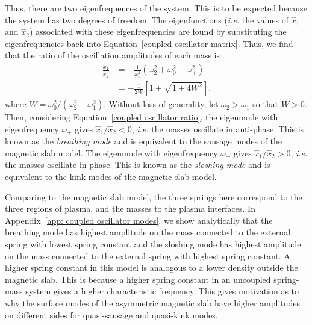 \documentclass[12pt]{../style-files/ociamthesis}
\begin{document}
Thus, there are two eigenfrequences of the system. This is to be expected because the system has two degrees of freedom. The eigenfunctions (\textit{i.e.} the values of $\hat{x}_1$ and $\hat{x}_2$) associated with these eigenfrequencies are found by substituting the eigenfrequencies back into Equation~\eqref{coupled oscillator matrix}. Thus, we find that the ratio of the oscillation amplitudes of each mass is
\begin{align}
	\frac{\hat{x}_1}{\hat{x}_2} & = -\frac{1}{\omega_0^2}(\omega_2^2 + \omega_0^2 - \omega_\pm^2) \\
	& = -\frac{1}{2W}\left[1 \pm \sqrt{1 + 4W^2} \right]. \label{coupled oscillator ratio}
\end{align}
where $W = \omega_0^2 / (\omega_2^2 - \omega_1^2)$. Without loss of generality, let $\omega_2 > \omega_1$ so that $W > 0$. Then, considering Equation~\ref{coupled oscillator ratio}, the eigenmode with eigenfrequency $\omega_+$ gives $\hat{x}_1 / \hat{x}_2 < 0$, \textit{i.e.} the masses oscillate in anti-phase. This is known as the \textit{breathing mode} and is equivalent to the sausage modes of the magnetic slab model. The eigenmode with eigenfrequency $\omega_-$ gives $\hat{x}_1 / \hat{x}_2 > 0$, \textit{i.e.} the masses oscillate in phase. This is known as the \textit{sloshing mode} and is equivalent to the kink modes of the magnetic slab model.

Comparing to the magnetic slab model, the three springs here correspond to the three regions of plasma, and the masses to the plasma interfaces. In Appendix~\ref{app: coupled oscillator modes}, we show analytically that the breathing mode has highest amplitude on the mass connected to the external spring with lowest spring constant and the sloshing mode has highest amplitude on the mass connected to the external spring with highest spring constant. A higher spring constant in this model is analogous to a lower density outside the magnetic slab. This is because a higher spring constant in an uncoupled spring-mass system gives a higher characteristic frequency. This gives motivation as to why the surface modes of the asymmetric magnetic slab have higher amplitudes on different sides for quasi-sausage and quasi-kink modes.
\end{document}
